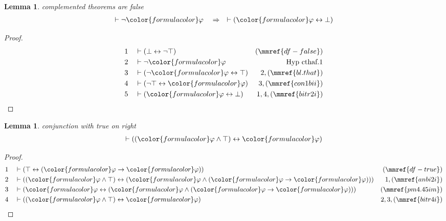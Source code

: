 \documentclass{article}
\theoremstyle{plain}
\newtheorem{lemma}{Theorem}[section]
\newtheorem{lemma}[theorem]{Lemma}
\begin{document}
\begin{lemma} complemented theorems are false
\begin{align}
\vdash \lnot {\color{formulacolor}\varphi}\quad\Rightarrow\quad \vdash (
    {\color{formulacolor}\varphi} \leftrightarrow \bot )\label{bl.cthaf}
\end{align}
\end{lemma}

\begin{proof}
\begin{align}
  1 && & \vdash ( \bot \leftrightarrow \lnot \top )&(\mmref{df-false})\notag
  \\ 2 && & \vdash \lnot
{\color{formulacolor}\varphi}&\text{Hyp~cthaf.1}\notag%
  \\ 3 && & \vdash ( \lnot {\color{formulacolor}\varphi} \leftrightarrow \top
      )&2,(\mmref{bl.that})\notag
  \\ 4 && & \vdash ( \lnot \top \leftrightarrow {\color{formulacolor}\varphi}
      )&3,(\mmref{con1bii})\notag
  \\ 5 && & \vdash ( {\color{formulacolor}\varphi} \leftrightarrow \bot
      )&1,4,(\mmref{bitr2i})\notag
\end{align}
\end{proof}

\begin{lemma} conjunction with true on right
\begin{align}
\vdash ( ( {\color{formulacolor}\varphi} \wedge \top ) \leftrightarrow
    {\color{formulacolor}\varphi} )\label{bl.antrr}
\end{align}
\end{lemma}

\begin{proof}
\begin{align}
  1 && & \vdash ( \top \leftrightarrow ( {\color{formulacolor}\varphi}
      \rightarrow {\color{formulacolor}\varphi} )
      )&(\mmref{df-true})\notag
  \\ 2 && & \vdash ( ( {\color{formulacolor}\varphi} \wedge \top )
      \leftrightarrow ( {\color{formulacolor}\varphi}
      \wedge ( {\color{formulacolor}\varphi} \rightarrow
      {\color{formulacolor}\varphi} ) )
      )&1,(\mmref{anbi2i})\notag
  \\ 3 && & \vdash ( {\color{formulacolor}\varphi} \leftrightarrow (
      {\color{formulacolor}\varphi} \wedge (
      {\color{formulacolor}\varphi} \rightarrow
      {\color{formulacolor}\varphi} ) )
      )&(\mmref{pm4.45im})\notag
  \\ 4 && & \vdash ( ( {\color{formulacolor}\varphi} \wedge \top )
      \leftrightarrow {\color{formulacolor}\varphi}
      )&2,3,(\mmref{bitr4i})\notag
\end{align}
\end{proof}
\end{document}
